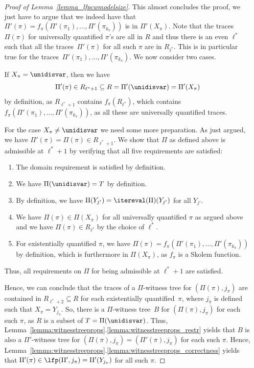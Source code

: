 \begin{proof}[Proof of Lemma~\ref{lemma_lfpcwmodelsize}]
This almost concludes the proof, we just have to argue that we indeed have that $\Pi'(\pi)= f_{\pi}(\Pi'(\pi_1), \ldots, \Pi'(\pi_{k_\pi}))$ is in $\Pi'(X_\pi) $.
Note that the traces~$\Pi(\pi)$ for universally quantified $\pi$'s are all in $R$ and thus there is an even $\ell^*$ such that all the traces~$\Pi'(\pi)$ for all such $\pi$ are in $R_{\ell^*}$. 
This is in particular true for the traces~$\Pi'(\pi_1), \ldots, \Pi'(\pi_{k_\pi})$. 
We now consider two cases.

If $X_\pi = \unidisvar$, then we have \[\Pi'(\pi) \in R_{\ell^*+1} \subseteq R = \Pi'(\unidisvar) = \Pi'(X_\pi)\] by definition, as $R_{\ell^*+1}$ contains $f_\pi(R_{\ell^*})$, which contains $f_{\pi}(\Pi'(\pi_1), \ldots, \Pi'(\pi_{k_\pi}))$, as all these are universally quantified traces.

For the case $X_\pi \neq \unidisvar$ we need some more preparation.
As just argued, we have $\Pi'(\pi) = \Pi(\pi) \in R_{\ell^*+1}$.
We show that $\Pi$ as defined above is admissible at $\ell^*+1$ by verifying that all five requirements are satisfied:
\begin{enumerate}
    \item The domain requirement is satisfied by definition.
    \item We have $\Pi(\unidisvar) = T$ by definition.
    \item By definition, we have $\Pi(Y_{j'}) = \itereval(\Pi)(Y_{j'})$ for all $Y_{j'}$.
    \item We have $\Pi(\pi) \in \Pi(X_\pi)$ for all universally quantified $\pi$ as argued above and we have $\Pi(\pi) \in R_{\ell^*}$ by the choice of $\ell^*$.
    \item For existentially quantified $\pi$, we have $\Pi(\pi) = f_\pi(\Pi'(\pi_1), \ldots, \Pi'(\pi_{k_\pi}))$ by definition, which is furthermore in $\Pi(X_\pi)$, as $f_\pi$ is a Skolem function.
\end{enumerate}
Thus, all requirements on $\Pi$ for being admissible at $\ell^*+1$ are satisfied.

Hence, we can conclude that the traces of a $\Pi$-witness tree for $(\Pi(\pi),j_\pi)$ are contained in $R_{\ell^*+2} \subseteq R$ for each existentially quantified~$\pi$, where $j_\pi$ is defined such that $X_\pi = Y_{j_\pi}$.
So, there is a $\Pi$-witness tree~$B$ for $(\Pi(\pi),j_\pi)$ for each such $\pi$, as $R$ is a subset of $T = \Pi(\unidisvar)$.
Thus, Lemma~\ref{lemma:witnesstreeprops}.\ref{lemma:witnesstreeprops_restr} yields that $B$ is also a $\Pi'$-witness tree for $(\Pi(\pi),j_\pi) = (\Pi'(\pi),j_\pi)$ for each such $\pi$.
Hence, Lemma~\ref{lemma:witnesstreeprops}.\ref{lemma:witnesstreeprops_correctness} yields that $\Pi'(\pi) \in \lfp(\Pi',j_\pi) = \Pi'(Y_{j_\pi})$ for all such $\pi$. 
\end{proof}

